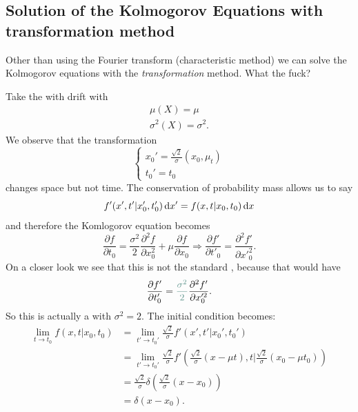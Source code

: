 \documentclass[12pt]{report}
\begin{document}
\subsection{Solution of the Kolmogorov Equations with transformation method}
Other than using the Fourier transform (characteristic method) we can solve the Kolmogorov equations with the \emph{transformation} method. What the fuck?\par
Take the \bwm{} with drift with
\begin{equation*}
	\begin{array}{c}
		\mu(X)=\mu\\
		\sigma^{2}(X)=\sigma^{2}.
	\end{array}
\end{equation*}
We observe that the transformation 
\begin{equation*}
	\begin{cases}
		x_{0}'=\frac{\sqrt{2}}{\sigma}(x_{0},\mu_t)\\
		t_{0}'=t_{0}
	\end{cases}
\end{equation*}
changes space but not time. The conservation of probability mass allows us to say
\begin{equation*}
	f'(x',t'|x_{0}',t_{0}')\mathop{}\!\mathrm{d} x'=f(x,t|x_{0},t_{0})\mathop{}\!\mathrm{d} x
\end{equation*}
and therefore the Komlogorov equation becomes
\begin{equation*}
	\frac{\partial f}{\partial t_{0}}=\frac{\sigma^{2}}{2}\frac{\partial^{2}f}{\partial x_{0}^{2}}+\mu\frac{\partial f}{\partial x_{0}}\Longrightarrow\frac{\partial f'}{\partial t'_{0}}=\frac{\partial^{2}f'}{\partial x'^{2}_{0}}.
\end{equation*}
On a closer look we see that this is not the standard \bwm, because that would have
\begin{equation*}
	\frac{\partial f'}{\partial t'_{0}}=\mathcolor{SeaGreen2!53!MediumOrchid4}{\frac{\sigma^{2}}{2}}\frac{\partial^{2}f'}{\partial x'^{2}_{0}}.
\end{equation*}
So this is actually a \bwm{} with $\sigma^{2}=2$. The initial condition becomes:
\begin{align*}
	\lim_{t\to t_0}f(x,t|x_{0},t_{0})&=\lim_{t'\to t_{0}'}\frac{\sqrt{2}}{\sigma}f'(x',t'|x_{0}',t_{0}')\\
	&=\lim_{t'\to t_{0}'}\frac{\sqrt{2}}{\sigma}f'\left(\frac{\sqrt{2}}{\sigma}(x-\mu t),t\Big|\frac{\sqrt{2}}{\sigma}(x_{0}-\mu t_{0})\right)\\
	&=\frac{\sqrt{2}}{\sigma}\delta\left(\frac{\sqrt{2}}{\sigma}(x-x_{0})\right)\\
	&=\delta(x-x_{0}).
\end{align*}
\end{document}
